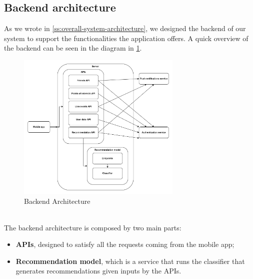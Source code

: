\documentclass[../../main]{subfiles}
\begin{document}
\subsection{Backend architecture}
\label{ss:backend-architecture}

As we wrote in \ref{ss:overall-system-architecture}, we designed the backend of our system to support the functionalities the application offers.
A quick overview of the backend can be seen in the diagram in \ref{fig:backend_architecture}.
\begin{figure}[h]
    \centering
    \includegraphics[width=0.7\textwidth]{images/backend_architecture}
    \caption{Backend Architecture}\label{fig:backend_architecture}
\end{figure}\\
\noindent
The backend architecture is composed by two main parts:
\begin{itemize}
    \item \textbf{APIs}, designed to satisfy all the requests coming from the mobile app;
    \item \textbf{Recommendation model}, which is a service that runs the classifier that generates recommendations given inputs by the APIs.
\end{itemize}

\label{sss:apis}
\end{document}
